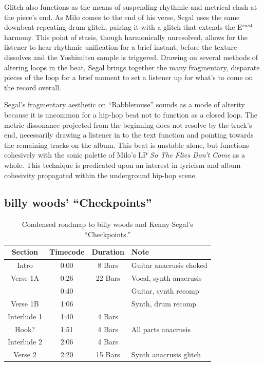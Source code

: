 Glitch also functions as the means of suspending rhythmic and metrical clash at the piece's end. As Milo
comes to the end of his verse, Segal uses the same downbeat-repeating drum glitch, pairing it with a 
glitch that extends the E$^{sus4}$ harmony. This point of stasis, though harmonically unresolved, allows
for the listener to hear rhythmic unification for a brief instant, before the texture dissolves and the
Yoshimitsu sample is triggered. Drawing on several methods of altering loops in the beat, Segal brings
together the many fragmentary, disparate pieces of the loop for a brief moment to set a listener up for
what's to come on the record overall.

Segal's fragmentary aesthetic on ``Rabblerouse'' sounds as a mode of alterity because it is uncommon for
a hip-hop beat not to function as a closed loop. The metric dissonance projected from the beginning does
not resolve by the track's end, necessarily drawing a listener in to the text function and pointing 
towards the remaining tracks on the album. This beat is unstable alone, but functions cohesively with 
the sonic palette of Milo's LP \textit{So The Flies Don't Come} as a whole. This technique is predicated 
upon an interest in lyricism and album cohesivity propagated within the underground hip-hop scene.

\subsection*{\centering billy woods' ``Checkpoints''}

\begin{table}[ht]
    \centering
    \begin{tabular}{|c|c|c|l|}
        \hline
         Section      & Timecode & Duration & Note                          \\ \hline
         Intro        & 0:00     & 8 Bars   & Guitar anacrusis choked       \\ \hline
         Verse 1A     & 0:26     & 22 Bars  & Vocal, synth  anacrusis       \\ \hline
                      & 0:40     &          & Guitar, synth recomp          \\ \hline
         Verse 1B     & 1:06     &          & Synth, drum recomp            \\ \hline
         Interlude 1  & 1:40     & 4 Bars   &                               \\ \hline
         Hook?        & 1:51     & 4 Bars   & All parts anacrusis           \\ \hline
         Interlude 2  & 2:06     & 4 Bars   &                               \\ \hline
         Verse 2      & 2:20     & 15 Bars  & Synth anacrusis glitch        \\ \hline
         
    \end{tabular}
    \caption{Condensed roadmap to billy woods and Kenny Segal's ``Checkpoints.''}
    \label{tab:checkpoints}
\end{table}

